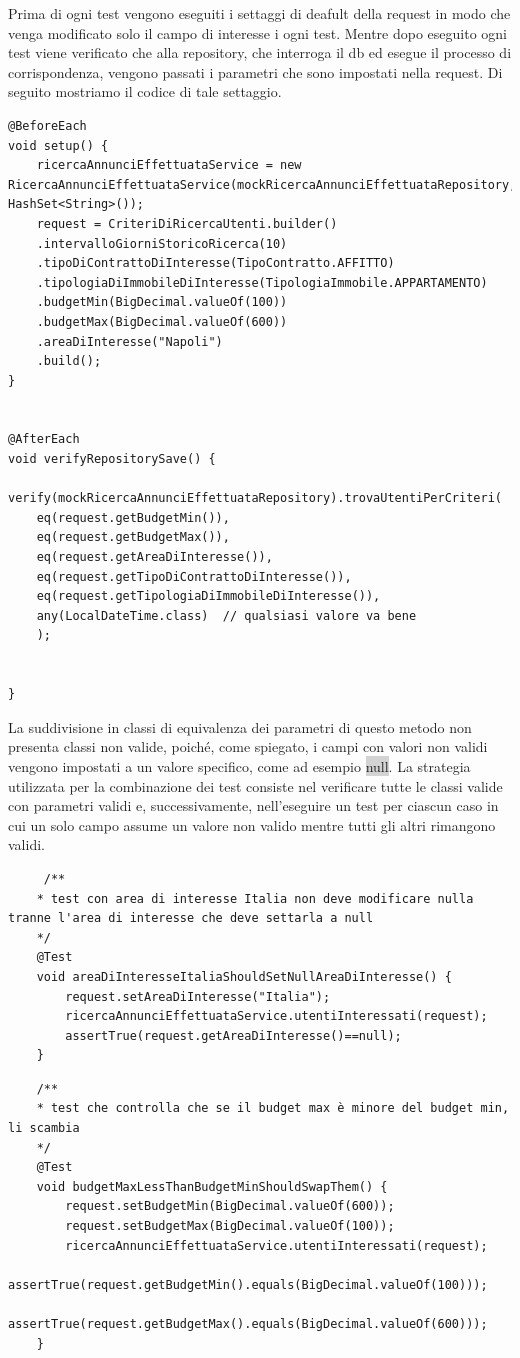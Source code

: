 Prima di ogni test vengono eseguiti i settaggi di deafult della request in modo che venga modificato solo il campo di interesse i ogni test.
Mentre dopo eseguito ogni test viene verificato che alla repository, che interroga il db ed esegue il processo di corrispondenza, vengono passati i parametri che sono impostati nella request. Di seguito mostriamo il codice di tale settaggio.

\begin{lstlisting}
@BeforeEach 
void setup() {
	ricercaAnnunciEffettuataService = new RicercaAnnunciEffettuataService(mockRicercaAnnunciEffettuataRepository,MockUserRepository,new HashSet<String>());
	request = CriteriDiRicercaUtenti.builder()
	.intervalloGiorniStoricoRicerca(10)
	.tipoDiContrattoDiInteresse(TipoContratto.AFFITTO)
	.tipologiaDiImmobileDiInteresse(TipologiaImmobile.APPARTAMENTO)
	.budgetMin(BigDecimal.valueOf(100))
	.budgetMax(BigDecimal.valueOf(600))
	.areaDiInteresse("Napoli")
	.build();
}


@AfterEach 
void verifyRepositorySave() {
	verify(mockRicercaAnnunciEffettuataRepository).trovaUtentiPerCriteri(
	eq(request.getBudgetMin()),
	eq(request.getBudgetMax()),
	eq(request.getAreaDiInteresse()),
	eq(request.getTipoDiContrattoDiInteresse()),
	eq(request.getTipologiaDiImmobileDiInteresse()),
	any(LocalDateTime.class)  // qualsiasi valore va bene
	);
	
	
}
\end{lstlisting}

La suddivisione in classi di equivalenza dei parametri di questo metodo non presenta classi non valide, poiché, come spiegato, i campi con valori non validi vengono impostati a un valore specifico, come ad esempio \colorbox{lightgray}{null}.
La strategia utilizzata per la combinazione dei test consiste nel verificare tutte le classi valide con parametri validi e, successivamente, nell’eseguire un test per ciascun caso in cui un solo campo assume un valore non valido mentre tutti gli altri rimangono validi.


\begin{lstlisting}
	 /**
	* test con area di interesse Italia non deve modificare nulla tranne l'area di interesse che deve settarla a null
	*/
	@Test
	void areaDiInteresseItaliaShouldSetNullAreaDiInteresse() {
		request.setAreaDiInteresse("Italia");
		ricercaAnnunciEffettuataService.utentiInteressati(request);
		assertTrue(request.getAreaDiInteresse()==null);
	}
\end{lstlisting}

\begin{lstlisting}
	/**
	* test che controlla che se il budget max è minore del budget min, li scambia
	*/
	@Test
	void budgetMaxLessThanBudgetMinShouldSwapThem() {
		request.setBudgetMin(BigDecimal.valueOf(600));
		request.setBudgetMax(BigDecimal.valueOf(100));
		ricercaAnnunciEffettuataService.utentiInteressati(request);
		assertTrue(request.getBudgetMin().equals(BigDecimal.valueOf(100)));
		assertTrue(request.getBudgetMax().equals(BigDecimal.valueOf(600)));
	}
\end{lstlisting}


